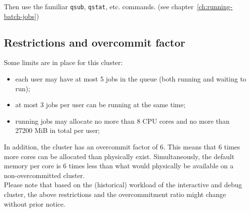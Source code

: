 \begin{prompt}
\end{prompt}

Then use the familiar \lstinline|qsub|, \lstinline|qstat|, etc. commands. (see chapter~\ref{ch:running-batch-jobs})

\subsection{Restrictions and overcommit factor}
\label{subsec:interactive_ugent_restrictions}

Some limits are in place for this cluster:
\begin{itemize}
  \item each user may have at most 5 jobs in the queue (both running and waiting to run);
  \item at most 3 jobs per user can be running at the same time;
  \item running jobs may allocate no more than 8 CPU cores and no more than 27200 MiB in total per user;
\end{itemize}

In addition, the cluster has an overcommit factor of 6. This means that 6 times more cores
can be allocated than physically exist. Simultaneously, the default memory per core is 6
times less than what would physically be available on a non-overcommitted cluster.
 \\
Please note that based on the (historical) workload of the interactive and debug cluster, the above
restrictions and the overcommitment ratio might change without prior notice.
